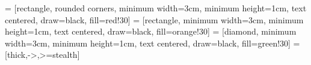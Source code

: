 
\newcommand{\setcolor}[1]{\def\chosencolor{#1}}

\newcommand{\setdepartment}[1]{\def\department{#1}}

\newcommand{\inserttitlepage}{
    \begin{frame}[noframenumbering]
        \vspace{2em}
        \centering
        {\Huge \bfseries \inserttitle}

        \vspace{2em}
        {\large \insertauthor}

        \vspace{1em}
        {\normalsize \insertinstitute}\\
        \vspace{0.5em}
        {\normalsize \insertdate}

        \vfill
    \end{frame}
}

\usetikzlibrary{shapes.geometric, arrows}
 = [rectangle, rounded corners, minimum width=3cm, minimum height=1cm, text centered, draw=black, fill=red!30]
 = [rectangle, minimum width=3cm, minimum height=1cm, text centered, draw=black, fill=orange!30]
 = [diamond, minimum width=3cm, minimum height=1cm, text centered, draw=black, fill=green!30]
 = [thick,->,>=stealth]
